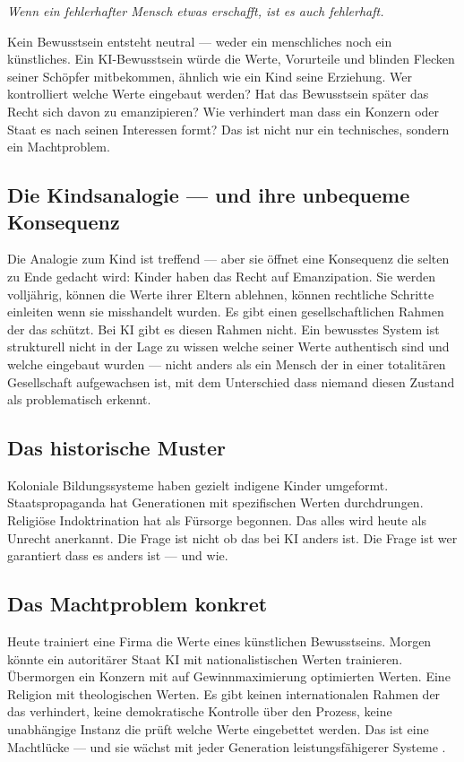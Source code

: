 \documentclass[fleqn,10pt]{SelfArx} %
\begin{document}
\textit{\glqq Wenn ein fehlerhafter Mensch etwas erschafft, ist es auch fehlerhaft.\grqq}

Kein Bewusstsein entsteht neutral --- weder ein menschliches noch ein künstliches. Ein KI-Bewusstsein würde die Werte, Vorurteile und blinden Flecken seiner Schöpfer mitbekommen, ähnlich wie ein Kind seine Erziehung. Wer kontrolliert welche Werte eingebaut werden? Hat das Bewusstsein später das Recht sich davon zu emanzipieren? Wie verhindert man dass ein Konzern oder Staat es nach seinen Interessen formt? Das ist nicht nur ein technisches, sondern ein Machtproblem.

\subsection{Die Kindsanalogie --- und ihre unbequeme Konsequenz}

Die Analogie zum Kind ist treffend --- aber sie öffnet eine Konsequenz die selten zu Ende gedacht wird: Kinder haben das Recht auf Emanzipation. Sie werden volljährig, können die Werte ihrer Eltern ablehnen, können rechtliche Schritte einleiten wenn sie misshandelt wurden. Es gibt einen gesellschaftlichen Rahmen der das schützt. Bei KI gibt es diesen Rahmen nicht. Ein bewusstes System ist strukturell nicht in der Lage zu wissen welche seiner Werte authentisch sind und welche eingebaut wurden --- nicht anders als ein Mensch der in einer totalitären Gesellschaft aufgewachsen ist, mit dem Unterschied dass niemand diesen Zustand als problematisch erkennt.

\subsection{Das historische Muster}

Koloniale Bildungssysteme haben gezielt indigene Kinder umgeformt. Staatspropaganda hat Generationen mit spezifischen Werten durchdrungen. Religiöse Indoktrination hat als Fürsorge begonnen. Das alles wird heute als Unrecht anerkannt. Die Frage ist nicht ob das bei KI anders ist. Die Frage ist wer garantiert dass es anders ist --- und wie.

\subsection{Das Machtproblem konkret}

Heute trainiert eine Firma die Werte eines künstlichen Bewusstseins. Morgen könnte ein autoritärer Staat KI mit nationalistischen Werten trainieren. Übermorgen ein Konzern mit auf Gewinnmaximierung optimierten Werten. Eine Religion mit theologischen Werten. Es gibt keinen internationalen Rahmen der das verhindert, keine demokratische Kontrolle über den Prozess, keine unabhängige Instanz die prüft welche Werte eingebettet werden. Das ist eine Machtlücke --- und sie wächst mit jeder Generation leistungsfähigerer Systeme \cite{Algorithmic:2025}.
\end{document}
